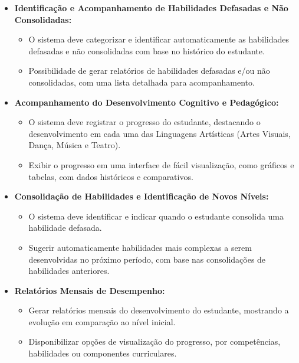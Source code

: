 \begin{enumerate}[label=\arabic*)]
\begin{itemize}[leftmargin=2em]
\begin{itemize}
            \item \textbf{Identificação e Acompanhamento de Habilidades Defasadas e Não Consolidadas:}
            \begin{itemize}
                \item O sistema deve categorizar e identificar automaticamente as habilidades defasadas e não consolidadas com base no histórico do estudante.
                \item Possibilidade de gerar relatórios de habilidades defasadas e/ou não consolidadas, com uma lista detalhada para acompanhamento.
            \end{itemize}

            \item \textbf{Acompanhamento do Desenvolvimento Cognitivo e Pedagógico:}
            \begin{itemize}
                \item O sistema deve registrar o progresso do estudante, destacando o desenvolvimento em cada uma das Linguagens Artísticas (Artes Visuais, Dança, Música e Teatro).
                \item Exibir o progresso em uma interface de fácil visualização, como gráficos e tabelas, com dados históricos e comparativos.
            \end{itemize}

            \item \textbf{Consolidação de Habilidades e Identificação de Novos Níveis:}
            \begin{itemize}
                \item O sistema deve identificar e indicar quando o estudante consolida uma habilidade defasada.
                \item Sugerir automaticamente habilidades mais complexas a serem desenvolvidas no próximo período, com base nas consolidações de habilidades anteriores.
            \end{itemize}

            \item \textbf{Relatórios Mensais de Desempenho:}
            \begin{itemize}
                \item Gerar relatórios mensais do desenvolvimento do estudante, mostrando a evolução em comparação ao nível inicial.
                \item Disponibilizar opções de visualização do progresso, por competências, habilidades ou componentes curriculares.
            \end{itemize}


\end{itemize}
\end{itemize}
\end{enumerate}
